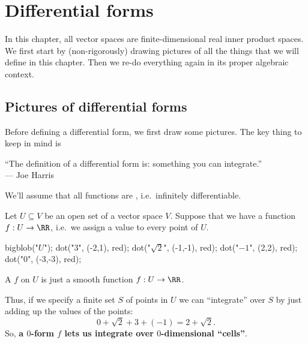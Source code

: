 \chapter{Differential forms}
In this chapter, all vector spaces are finite-dimensional
real inner product spaces.
We first start by (non-rigorously) drawing pictures
of all the things that we will define in this chapter.
Then we re-do everything again in its proper algebraic context.

\section{Pictures of differential forms}
Before defining a differential form,
we first draw some pictures.
The key thing to keep in mind is
\begin{moral}
	``The definition of a differential form is:
	something you can integrate.'' \\ --- Joe Harris
\end{moral}

We'll assume that all functions are ,
i.e.\ infinitely differentiable.

Let $U \subseteq V$ be an open set of a vector space $V$.
Suppose that we have a function $f : U \to \RR$, i.e.\
we assign a value to every point of $U$.
\begin{center}
	\begin{asy}
		bigblob("$U$");
		dot("$3$", (-2,1), red);
		dot("$\sqrt2$", (-1,-1), red);
		dot("$-1$", (2,2), red);
		dot("$0$", (-3,-3), red);
	\end{asy}
\end{center}
\begin{definition}
	A  $f$ on $U$ is just a smooth function $f : U \to \RR$.
\end{definition}
Thus, if we specify a finite set $S$ of points in $U$
we can ``integrate'' over $S$ by just adding up the values
of the points:
\[ 0 + \sqrt 2 + 3 + (-1) = 2 + \sqrt2. \]
So, \textbf{a $0$-form $f$ lets us integrate over $0$-dimensional ``cells''}.


